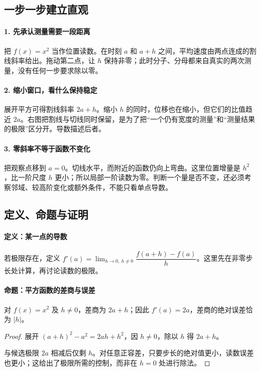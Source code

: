\subsection*{一步一步建立直观}

\paragraph{1. 先承认测量需要一段距离}

把 $f(x)=x^2$ 当作位置读数。在时刻 $a$ 和 $a+h$ 之间，平均速度由两点连成的割线斜率给出。拖动第二点，让 $h$ 保持非零；此时分子、分母都来自真实的两次测量，没有任何一步要求除以零。



\paragraph{2. 缩小窗口，看什么保持稳定}

展开平方可得割线斜率 $2a+h$。缩小 $h$ 的同时，位移也在缩小，但它们的比值趋近 $2a$。右图把割线与切线同时保留，是为了把“一个仍有宽度的测量”和“测量结果的极限”区分开。导数描述后者。



\paragraph{3. 零斜率不等于函数不变化}

把观察点移到 $a=0$。切线水平，而附近的函数仍向上弯曲。这里位置增量是 $h^2$，比一阶尺度 $h$ 更小；所以局部一阶读数为零。判断一个量是否不变，还必须考察邻域、较高阶变化或额外条件，不能只看单点导数。



\subsection*{定义、命题与证明}

\paragraph{定义：某一点的导数}

若极限存在，定义 $f'(a)=\lim_{h\to0,\ h\ne0}\dfrac{f(a+h)-f(a)}h$。这里先在非零步长处计算，再讨论读数的极限。

\paragraph{命题：平方函数的差商与误差}

对 $f(x)=x^2$ 及 $h\ne0$，差商为 $2a+h$；因此 $f'(a)=2a$，差商的绝对误差恰为 $|h|$。

\begin{proof}

展开 $(a+h)^2-a^2=2ah+h^2$，因 $h\ne0$，除以 $h$ 得 $2a+h$。

与候选极限 $2a$ 相减后仅剩 $h$。对任意正容差，只要步长的绝对值更小，读数误差也更小；这给出了极限所需的控制，而非在 $h=0$ 处进行除法。

\end{proof}
